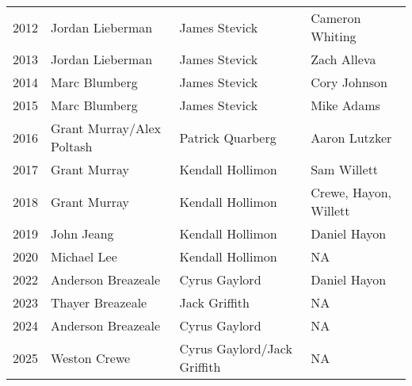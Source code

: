\begin{table}[htbp]
\begin{tabular}{c l l l}
2012 & Jordan Lieberman & James Stevick & Cameron Whiting \\
2013 & Jordan Lieberman & James Stevick & Zach Alleva \\
2014 & Marc Blumberg & James Stevick & Cory Johnson \\
2015 & Marc Blumberg & James Stevick & Mike Adams \\
2016 & Grant Murray/Alex Poltash & Patrick Quarberg & Aaron Lutzker \\
2017 & Grant Murray & Kendall Hollimon & Sam Willett \\
2018 & Grant Murray & Kendall Hollimon & Crewe, Hayon, Willett \\
2019 & John Jeang & Kendall Hollimon & Daniel Hayon \\
2020 & Michael Lee & Kendall Hollimon & NA \\
2022 & Anderson Breazeale & Cyrus Gaylord & Daniel Hayon \\
2023 & Thayer Breazeale & Jack Griffith & NA \\
2024 & Anderson Breazeale & Cyrus Gaylord & NA \\
2025 & Weston Crewe & Cyrus Gaylord/Jack Griffith & NA \\
\bottomrule
\end{tabular}
\end{table}


